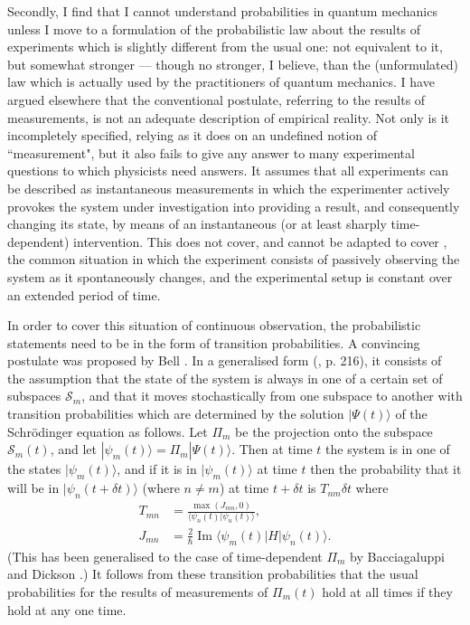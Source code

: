 \documentclass[12pt,a4paper,reqno]{article}
\renewcommand{\(}{\left(}
\renewcommand{\)}{\right)}
\renewcommand{\hbar}{\hslash}
\renewcommand{\S}{\mathcal{S}}
\newcommand{\<}{\langle}
\renewcommand{\>}{\rangle}
\renewcommand{\Im}{\operatorname{Im}}
\theoremstyle{plain} %
\theoremstyle{definition}
\theoremstyle{remark}
\begin{document}
Secondly, I find that I cannot understand probabilities in quantum
mechanics unless I move to a formulation of the probabilistic law about
the results of experiments which is slightly different from the usual
one: not equivalent to it, but somewhat stronger --- though no stronger,
I believe, than the (unformulated) law which is actually used by the
practitioners of quantum mechanics. I have argued elsewhere
\cite{verdammt} that the conventional postulate, referring to the
results of measurements, is not an adequate description of empirical
reality. Not only is it incompletely specified, relying as it does on an
undefined notion of ``measurement", but it also fails to give any answer
to many experimental questions to which physicists need answers. It
assumes that all experiments can be described as instantaneous
measurements in which the experimenter actively provokes the system
under investigation into providing a result, and consequently changing
its state, by means of an  instantaneous (or at least sharply
time-dependent) intervention. This does not cover, and cannot be adapted
to cover \cite{verdammt}, the common situation in which the experiment
consists of passively observing the system as it spontaneously changes,
and the experimental setup is constant over an extended period of time.

In order to cover this situation of continuous observation, the
probabilistic statements need to be in the form of transition
probabilities. A convincing postulate was proposed by Bell
\cite{Bell:beables}. In a generalised form (\cite{QMPN}, p. 216), it
consists of the assumption that the state of the system is always in one
of a certain set of subspaces $\S_m$, and that it moves stochastically
from one subspace to another with transition probabilities which are
determined by the solution $|\Psi(t)\>$ of the Schr\"odinger equation
as follows. Let $\Pi_m$ be the projection onto the subspace $\S_m(t)$, and
let $|\psi_m(t)\> = \Pi_m|\Psi(t)\>$. Then at time $t$ the system is in
one of the states $|\psi_m(t)\>$, and if it is in $|\psi_m(t)\>$ at time
$t$ then the probability that it will be in $|\psi_n(t+\delta t)\>$
(where $n\neq m$) at time $t+\delta t$ is $T_{nm}\delta t$ where
\begin{align}
T_{mn} &= \frac{\max(J_{mn},0)}{\<\psi_n(t)|\psi_n(t)\>},\\
J_{mn} &= 
\frac{2}{\hbar}\Im\<\psi_m(t)|H|\psi_n(t)\>. 
\end{align}
(This has been generalised to the case of time-dependent $\Pi_m$ by
Bacciagaluppi and Dickson \cite{BacciaDickson}.) It follows from these
transition probabilities that the usual probabilities for the results of
measurements of $\Pi_m(t)$ hold at all times if they hold at any one
time. 
\end{document}
